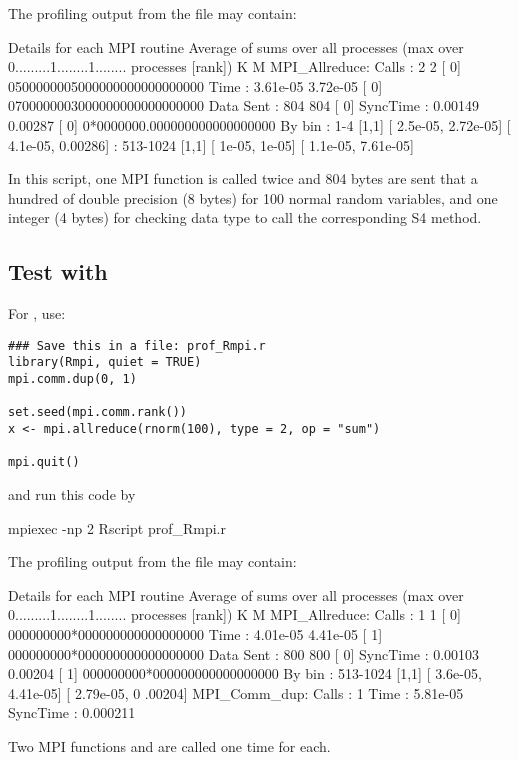 The  profiling output from the file  may contain:
\begin{Output}
Details for each MPI routine
                  Average of sums over all processes
                                (max over          0.........1........1........
                                 processes [rank])           K        M
MPI_Allreduce:
        Calls     :          2            2 [   0] 0500000005000000000000000000
        Time      :   3.61e-05     3.72e-05 [   0] 0700000003000000000000000000
        Data Sent :        804          804 [   0]
        SyncTime  :    0.00149      0.00287 [   0] 0*0000000.000000000000000000
        By bin    : 1-4 [1,1]   [   2.5e-05,  2.72e-05] [   4.1e-05,   0.00286]
                  : 513-1024    [1,1]   [     1e-05,     1e-05] [   1.1e-05,  7.61e-05]
\end{Output}
In this  script,
one MPI  function  is called twice and
804 bytes are sent that a hundred of double precision (8 bytes) for
100 normal random variables, and one integer (4 bytes) for checking
data type to call the corresponding S4 method.


\subsection{Test with }

For , use:
\begin{lstlisting}[language=rr,title=Test script for pbdMPI]
### Save this in a file: prof_Rmpi.r
library(Rmpi, quiet = TRUE)
mpi.comm.dup(0, 1)

set.seed(mpi.comm.rank())
x <- mpi.allreduce(rnorm(100), type = 2, op = "sum")

mpi.quit()
\end{lstlisting}
and run this code by
\begin{Code}
mpiexec -np 2 Rscript prof_Rmpi.r
\end{Code}

The  profiling output from the file  may contain:
\begin{Output}
Details for each MPI routine
                  Average of sums over all processes
                                (max over          0.........1........1........
                                 processes [rank])           K        M
MPI_Allreduce:
        Calls     :          1            1 [   0] 000000000*000000000000000000
        Time      :   4.01e-05     4.41e-05 [   1] 000000000*000000000000000000
        Data Sent :        800          800 [   0]
        SyncTime  :    0.00103      0.00204 [   1] 000000000*000000000000000000
        By bin    : 513-1024    [1,1]   [   3.6e-05,  4.41e-05] [  2.79e-05,   0
.00204]
MPI_Comm_dup:     
        Calls     :          1
        Time      :   5.81e-05
        SyncTime  :   0.000211
\end{Output}
Two MPI  functions  and 
are called one time for each.

